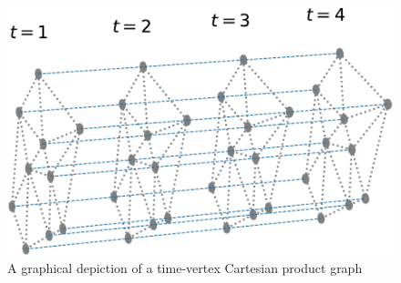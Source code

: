 \begin{figure}[t]
    \begin{center}
        \includegraphics[width=0.5\linewidth]{Figures/T-V.pdf}
    \end{center}
    \caption[A time-vertex Cartesian product graph]{A graphical depiction of a time-vertex Cartesian product graph}
    \label{fig:TV}
\end{figure}



